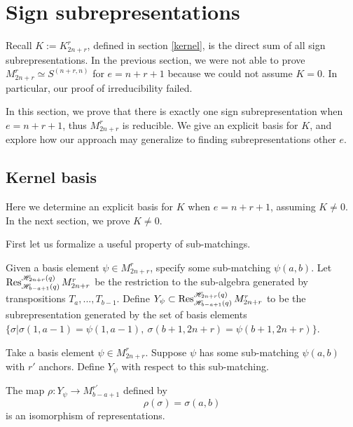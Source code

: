 \documentclass{amsart}
\begin{document}
 \section{Sign subrepresentations}\label{Sign section}
 Recall $K:=K^r_{2n+r}$, defined in section \ref{kernel}, is the direct sum of all sign subrepresentations. In the previous section, we were not able to prove $M_{2n+r}^r\simeq S^{(n+r,n)}$ for $e=n+r+1$ because we could not assume $K=0$. In particular, our proof of irreducibility failed.
 
 In this section, we prove that there is exactly one sign subrepresentation when $e=n+r+1$, thus $M_{2n+r}^r$ is reducible. We give an explicit basis for $K$, and explore how our approach may generalize to finding subrepresentations other $e$.
 
 
 \subsection{Kernel basis}
 
 
 Here we determine an explicit basis for $K$ when $e=n+r+1$, assuming $K\not=0$. In the next section, we prove $K\not=0$.
 
 First let us formalize a useful property of sub-matchings.
 
 \begin{definition}
 	Given a basis element $\psi\in M_{2n+r}^r$, specify some sub-matching $\psi(a,b)$. Let $\operatorname{Res}_{\mathscr{H}_{b-a+1}(q)}^{\mathscr{H}_{2n+r}(q)}M_{2n+r}^r$ be the restriction to the sub-algebra generated by transpositions $T_a,...,T_{b-1}$. Define $Y_\psi\subset\operatorname{Res}_{\mathscr{H}_{b-a+1}(q)}^{\mathscr{H}_{2n+r}(q)}M_{2n+r}^r$ to be the subrepresentation generated by the set of basis elements $\{\sigma| \sigma(1,a-1)=\psi(1,a-1),\ \sigma(b+1,2n+r)=\psi(b+1,2n+r)\}$.
 \end{definition}
 
 \begin{lemma}
 	Take a basis element $\psi\in M_{2n+r}^r$. Suppose $\psi$ has some sub-matching $\psi(a,b)$ with $r'$ anchors. Define $Y_\psi$ with respect to this sub-matching.
 	
 	The map $\rho:Y_\psi\rightarrow M_{b-a+1}^{r'}$ defined by $$\rho(\sigma)=\sigma(a,b)$$ is an isomorphism of representations.
 	
 	\label{sub-matching isomorphism}
 \end{lemma}
 
\end{document}
